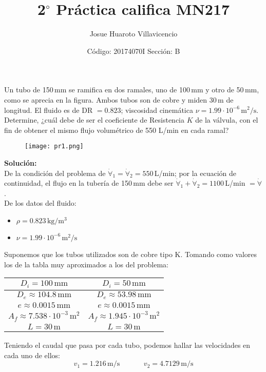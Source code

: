 \documentclass[a4paper,12pt]{exam}
\author{Josue Huaroto Villavicencio}
\date{Código: 20174070I \hspace{90pt} Sección: B}
\title{2$^{\circ}$ Práctica califica MN217}
\begin{document}
\maketitle
\begin{questions} 
\question[4] Un tubo de 150\,mm se ramifica en dos ramales, uno de 100\,mm y otro de 50\,mm, como se aprecia en la figura. Ambos tubos son de cobre y miden 30\,m de longitud. El fluido es de DR $= 0.823$; viscosidad cinemática $\nu = 1.99\cdot 10^{-6}\,\mathrm{m^{2}/s}$. Determine, ¿cuál debe de ser el coeficiente de Resistencia $K$ de la válvula, con el fin de obtener el mismo flujo volumétrico de 550 L/min en cada ramal?
\begin{figure}[H]
\centering
\texttt{[image: pr1.png]}
\end{figure}
\textbf{Solución:\\}
De la condición del problema de $\dot{\forall}_{1} = \dot{\forall}_{2} = 550\,$L/min; por la ecuación de continuidad, el flujo en la tubería de 150\,mm debe ser $\dot{\forall}_{1}+\dot{\forall}_{2} = 1100\,$L/min $ = \dot{\forall}$.\\
De los datos del fluido:
\begin{itemize}
\item $\rho = 0.823\,\mathrm{kg/m^{3}}$
\item $\nu = 1.99\cdot 10^{-6}\, \mathrm{m^{2}/s}$
\end{itemize}
Suponemos que los tubos utilizados son de cobre tipo K. Tomando como valores los de la tabla muy aproximados a los del problema:
\begin{center}
\begin{tabular}{|c|c|}
\hline 
$D_{i} = 100\,\mathrm{mm}$ & $D_{i} = 50\,\mathrm{mm} $ \\ 
\hline 
$D_{e} \approx 104.8\,\mathrm{mm}$ & $D_{e} \approx 53.98\,\mathrm{mm} $ \\ 
\hline 
$e \approx 0.0015\,\mathrm{mm}$ & $e \approx 0.0015\,\mathrm{mm}$ \\ 
\hline 
$A_{f} \approx 7.538\cdot 10^{-3}\,\mathrm{m^{2}}$ & $A_{f} \approx 1.945\cdot 10^{-3}\,\mathrm{m^{2}}$ \\ 
\hline 
$L = 30\,\mathrm{m}$ & $L = 30\,\mathrm{m}$ \\ 
\hline 
\end{tabular} 
\end{center}
Teniendo el caudal que pasa por cada tubo, podemos hallar las velocidades en cada uno de ellos:
$$
v_{1} = 1.216\,\mathrm{m/s} \hspace{40pt} v_{2} = 4.7129\,\mathrm{m/s}
$$
\end{questions}
\end{document}
